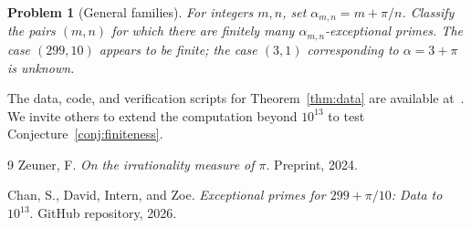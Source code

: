 \documentclass[12pt]{amsart}
\newtheorem{problem}[theorem]{Problem}
\begin{document}
\begin{problem}[General families]
\label{prob:general}
For integers $m,n$, set $\alpha_{m,n} = m + \pi/n$. Classify the pairs $(m,n)$ for which there are finitely many $\alpha_{m,n}$-exceptional primes. The case $(299,10)$ appears to be finite; the case $(3,1)$ corresponding to $\alpha = 3+\pi$ is unknown.
\end{problem}

The data, code, and verification scripts for Theorem~\ref{thm:data} are available at~\cite{chan2026}. We invite others to extend the computation beyond $10^{13}$ to test Conjecture~\ref{conj:finiteness}.

\begin{thebibliography}{9}
Zeuner, F. \textit{On the irrationality measure of $\pi$}. Preprint, 2024.

Chan, S., David, Intern, and Zoe. \textit{Exceptional primes for $299 + \pi/10$: Data to $10^{13}$}. GitHub repository, 2026.
\end{thebibliography}
\end{document}
